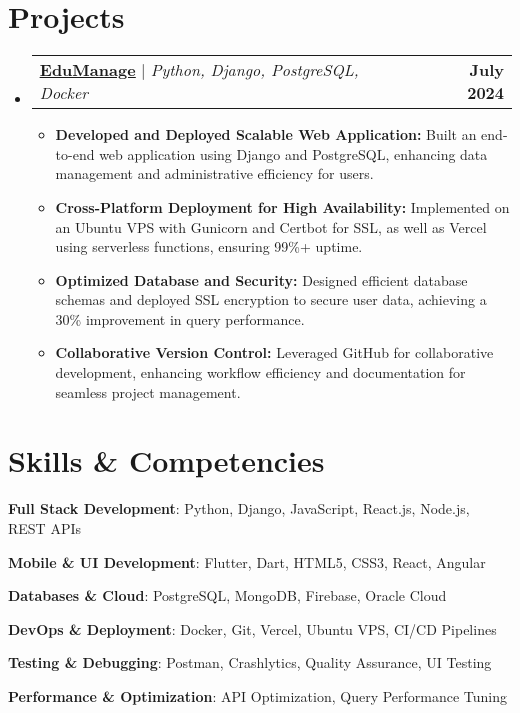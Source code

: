 \documentclass[a4paper,11pt]{article}
\makeatletter
\newcommand{\resumeItem}[1]{
	\item\small{#1 \vspace{-2pt}}
}
\newcommand{\resumeProjectHeading}[2]{
		\item
		\begin{tabular*}{0.97\textwidth}{l@{\extracolsep{\fill}}r}
			\small#1 & \textbf{\small #2} \\
		\end{tabular*}\vspace{-7pt}
}
\newcommand{\resumeSubHeadingListStart}{\begin{itemize}[leftmargin=0.15in, label={}]}
\newcommand{\resumeSubHeadingListEnd}{\end{itemize}}
\newcommand{\resumeItemListStart}{\begin{itemize}}
\newcommand{\resumeItemListEnd}{\end{itemize}\vspace{-5pt}}
\makeatother
\begin{document}
\section{Projects}
\resumeSubHeadingListStart
\resumeProjectHeading
{\textbf{\href{https://github.com/ajmalbuv/EduManage}{\underline{EduManage}}} $|$ \emph{Python, Django, PostgreSQL, Docker}}{July 2024}
\resumeItemListStart
\resumeItem{\textbf{Developed and Deployed Scalable Web Application:} Built an end-to-end web application using Django and PostgreSQL, enhancing data management and administrative efficiency for users.}
\resumeItem{\textbf{Cross-Platform Deployment for High Availability:} Implemented on an Ubuntu VPS with Gunicorn and Certbot for SSL, as well as Vercel using serverless functions, ensuring 99\%+ uptime.}
\resumeItem{\textbf{Optimized Database and Security:} Designed efficient database schemas and deployed SSL encryption to secure user data, achieving a 30\% improvement in query performance.}
\resumeItem{\textbf{Collaborative Version Control:} Leveraged GitHub for collaborative development, enhancing workflow efficiency and documentation for seamless project management.}
\resumeItemListEnd
\resumeSubHeadingListEnd


\section{Skills \& Competencies}
\begin{itemize}[leftmargin=0.15in, label={}, itemsep=0pt]
    \small{
        \item \textbf{Full Stack Development}: Python, Django, JavaScript, React.js, Node.js, REST APIs
        \item \textbf{Mobile \& UI Development}: Flutter, Dart, HTML5, CSS3, React, Angular
        \item \textbf{Databases \& Cloud}: PostgreSQL, MongoDB, Firebase, Oracle Cloud
        \item \textbf{DevOps \& Deployment}: Docker, Git, Vercel, Ubuntu VPS, CI/CD Pipelines
        \item \textbf{Testing \& Debugging}: Postman, Crashlytics, Quality Assurance, UI Testing
        \item \textbf{Performance \& Optimization}: API Optimization, Query Performance Tuning
    }
\end{itemize}
\end{document}
